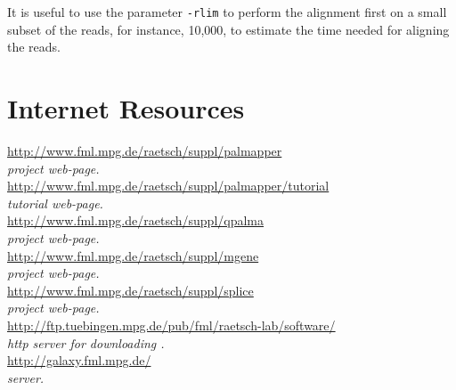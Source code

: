 \documentclass{article}
\begin{document}
It is useful to use the parameter \texttt{-rlim} to perform the  
alignment first on a small subset of the reads, for instance, 10,000, 
to estimate the time needed for aligning the reads.

\section{Internet Resources}
\url{http://www.fml.mpg.de/raetsch/suppl/palmapper}\\
\emph{\PALMapper{} project web-page.}\\
\url{http://www.fml.mpg.de/raetsch/suppl/palmapper/tutorial}\\
\emph{\PALMapper{} tutorial web-page.}\\
\url{http://www.fml.mpg.de/raetsch/suppl/qpalma}\\
\emph{\QP{} project web-page.}\\
\url{http://www.fml.mpg.de/raetsch/suppl/mgene}\\
\emph{\mGene{} project web-page.}\\
\url{http://www.fml.mpg.de/raetsch/suppl/splice}\\
\emph{\ASP{} project web-page.}\\
\url{http://ftp.tuebingen.mpg.de/pub/fml/raetsch-lab/software/}\\
\emph{http server for downloading \QP{}.}\\
\url{http://galaxy.fml.mpg.de/}\\
\emph{\Galaxy{} server.}\\

%
% 
\end{document}
